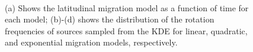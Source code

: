 \begin{figure}[!ht]
	\centering
	\qquad
	 \\
	
	\qquad
	
	\qquad
	
	\caption{(a) Shows the latitudinal migration model as a function of time for each model; (b)-(d) shows the distribution of the rotation frequencies of sources sampled from the KDE for linear, quadratic, and exponential migration models, respectively.}
	\label{fig:artificial_sim_plots}
\end{figure}

